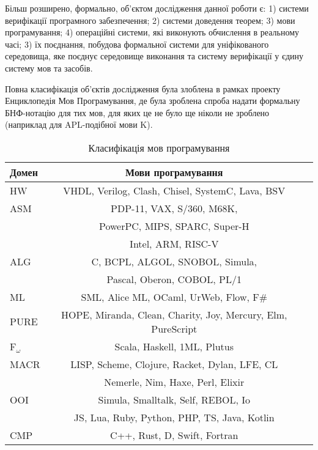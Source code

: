 Більш розширено, формально, об'єктом дослідження данної роботи є:
1) системи верифікації програмного забезпечення;
2) системи доведення теорем;
3) мови програмування;
4) операційні системи, які виконують обчислення в реальному часі;
3) їх поєднання, побудова формальної системи для
уніфікованого середовища, яке поєднує середовище
виконання та систему верифікації у єдину систему мов та засобів.

Повна класифікація об'єктів дослідження була злоблена в рамках проекту
Енциклопедія Мов Програмування, де була зроблена спроба надати
формальну БНФ-нотацію для тих мов, для яких це не було ще ніколи
не зроблено (наприклад для APL-подібної мови K).

\begin{table}
  \caption{Класифікація мов програмування}
 \begin{tabular}{lcc}
    \hline
       \textbf{Домен} & \textbf{Мови програмування} \\
    \hline
       HW & VHDL, Verilog, Clash, Chisel, SystemC, Lava, BSV \\
    \hline
\rowcolor{LightGray25}
       ASM & PDP-11, VAX, S/360, M68K,  \\
\rowcolor{LightGray25}
           & PowerPC, MIPS, SPARC, Super-H \\
\rowcolor{LightGray25}
           & Intel, ARM, RISC-V \\
    \hline
       ALG & C, BCPL, ALGOL, SNOBOL, Simula, \\
           & Pascal, Oberon, COBOL, PL/1 \\
    \hline
\rowcolor{LightGray}
       ML & SML, Alice ML, OCaml, UrWeb, Flow, F\# \\
    \hline
\rowcolor{LightGray}
       PURE & HOPE, Miranda, Clean, Charity, Joy, Mercury, Elm, PureScript \\
    \hline
\rowcolor{LightGray}
       F$_\omega$ & Scala, Haskell, 1ML, Plutus \\
    \hline
\rowcolor{LightGray25}
       MACR & LISP, Scheme, Clojure, Racket, Dylan, LFE, CL \\
\rowcolor{LightGray25}
            & Nemerle, Nim, Haxe, Perl, Elixir \\
    \hline
\rowcolor{LightGray25}
       OOI & Simula, Smalltalk, Self, REBOL, Io \\
\rowcolor{LightGray25}
           & JS, Lua, Ruby, Python, PHP, TS, Java, Kotlin \\
    \hline
\rowcolor{LightGray25}
       CMP & C++, Rust, D, Swift, Fortran \\

\end{tabular}
\end{table}
